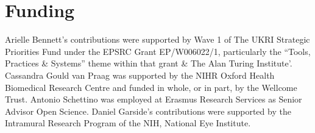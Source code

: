 \documentclass[authordate,meta]{jote-new-article}
\begin{document}
\section{Funding}



Arielle Bennett's contributions were supported by Wave 1 of The UKRI Strategic Priorities Fund under the EPSRC Grant EP/W006022/1, particularly the “Tools, Practices \& Systems” theme within that grant \& The Alan Turing Institute'. Cassandra Gould van Praag was supported by the NIHR Oxford Health Biomedical Research Centre and funded in whole, or in part, by the Wellcome Trust. Antonio Schettino was employed at Erasmus Research Services as Senior Advisor Open Science. Daniel Garside’s contributions were supported by the Intramural Research Program of the NIH, National Eye Institute.

\printbibliography
\end{document}
